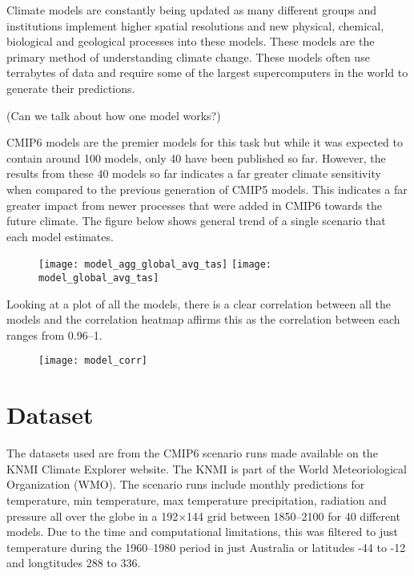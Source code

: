 \documentclass[honours,12pt]{unswthesis}
\numberwithin{equation}{section}
\begin{document}
{\noindent} Climate models are constantly being updated as many different groups and institutions implement higher spatial resolutions and 
new physical, chemical, biological and geological processes into these models. These models are the primary method of understanding climate change.
These models often use terrabytes of data and require some of the largest supercomputers in the world to generate their predictions. 

(Can we talk about how one model works?)

{\noindent}CMIP6 models are the premier models for this task but while it was expected to contain around 100 models, only 40 have been published so far.
However, the results from these 40 models so far indicates a far greater climate sensitivity when compared to the previous generation of CMIP5 models.\cite{Harrisson_2021}
This indicates a far greater impact from newer processes that were added in CMIP6 towards the future climate. The figure below shows general trend of a single
scenario that each model estimates.

\begin{figure}[!h]
    \texttt{[image: model\_agg\_global\_avg\_tas]}
    \texttt{[image: model\_global\_avg\_tas]}
    \centering
\end{figure}

Looking at a plot of all the models, there is a clear correlation between all the models and the correlation heatmap affirms this as the correlation between each
ranges from 0.96--1. 

\begin{figure}[t]
    \texttt{[image: model\_corr]}
    \centering
\end{figure}

\section{Dataset}\label{data}
The datasets used are from the CMIP6 scenario runs made available on the KNMI Climate Explorer website. The KNMI is part of the
World Meteoriological Organization (WMO)\cite{}. The scenario runs include monthly predictions for temperature, min temperature, max temperature
precipitation, radiation and pressure all over the globe in a 192$\times$144 grid between 1850--2100 for 40 different models. Due to the time and computational
limitations, this was filtered to just temperature during the 1960--1980 period in just Australia or latitudes -44{\textdegree} to -12{\textdegree} 
and longtitudes 288{\textdegree} to 336{\textdegree}. 
\end{document}
